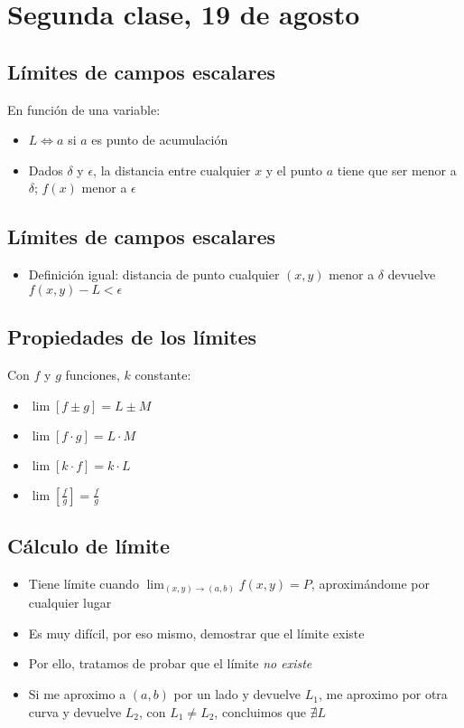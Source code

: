 \section{Segunda clase, 19 de agosto}

\subsection{Límites de campos escalares}

En función de una variable:
\begin{itemize}
    \item \(L \iff a\) si \(a\) es punto de acumulación
    \item Dados \(\delta\) y \(\epsilon\),
    la distancia entre cualquier \(x\) y el punto \(a\) tiene que ser menor a
    \(\delta\); \(f(x)\) menor a \(\epsilon\)
\end{itemize}

\subsection{Límites de campos escalares}

\begin{itemize}
    \item Definición igual: distancia de punto cualquier \((x,y)\) menor a 
    \(\delta\) devuelve \(f(x,y) - L < \epsilon\)
\end{itemize}

\subsection{Propiedades de los límites}

Con \(f\) y \(g\) funciones, \(k\) constante:
\begin{itemize}
    \item \(\lim\left[f \pm g\right] = L \pm M\)
    \item \(\lim\left[f \cdot g\right] = L \cdot M\)
    \item \(\lim\left[k \cdot f\right] = k \cdot L\)
    \item \(\lim\left[\frac{f}{g}\right] = \frac{f}{g}\)
\end{itemize}

\subsection{Cálculo de límite}

\begin{itemize}
    \item Tiene límite cuando \(\lim_{(x,y) \to (a,b)} f(x,y) = P\),
    aproximándome por cualquier lugar
    \item Es muy difícil, por eso mismo, demostrar que el límite existe
    \item Por ello, tratamos de probar que el límite \textit{no existe}
    \item Si me aproximo a \((a,b)\) por un lado y devuelve \(L_1\),
    me aproximo por otra curva y devuelve \(L_2\), con \(L_1 \neq L_2\),
    concluimos que \(\nexists L\)
\end{itemize}

